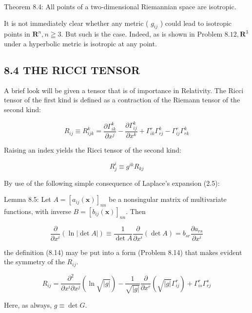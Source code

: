 \documentclass[10pt]{article}
\begin{document}
Theorem 8.4: All points of a two-dimensional Riemannian space are isotropic.

It is not immediately clear whether any metric ( $g_{i j}$ ) could lead to isotropic points in $\mathbf{R}^{n}, n \geqq 3$. But such is the case. Indeed, as is shown in Problem $8.12, \mathbf{R}^{3}$ under a hyperbolic metric is isotropic at any point.

\subsection*{8.4 THE RICCI TENSOR}
A brief look will be given a tensor that is of importance in Relativity. The Ricci tensor of the first kind is defined as a contraction of the Riemann tensor of the second kind:


\begin{equation*}
R_{i j} \equiv R_{i j k}^{k}=\frac{\partial \Gamma_{i k}^{k}}{\partial x^{j}}-\frac{\partial \Gamma_{i j}^{k}}{\partial x^{k}}+\Gamma_{i k}^{r} \Gamma_{r j}^{k}-\Gamma_{i j}^{r} \Gamma_{r k}^{k} \tag{8.14}
\end{equation*}


Raising an index yields the Ricci tensor of the second kind:


\begin{equation*}
R_{j}^{i} \equiv g^{i k} R_{k j} \tag{8.15}
\end{equation*}


By use of the following simple consequence of Laplace's expansion (2.5):

Lemma 8.5: Let $A=\left[a_{i j}(\mathbf{x})\right]_{n n}$ be a nonsingular matrix of multivariate functions, with inverse $B=\left[b_{i j}(\mathbf{x})\right]_{n n}$. Then

$$
\frac{\partial}{\partial x^{i}}(\ln |\operatorname{det} A|) \equiv \frac{1}{\operatorname{det} A} \frac{\partial}{\partial x^{i}}(\operatorname{det} A)=b_{s r} \frac{\partial a_{r s}}{\partial x^{i}}
$$

the definition (8.14) may be put into a form (Problem 8.14) that makes evident the symmetry of the $R_{i j}$.


\begin{equation*}
R_{i j}=\frac{\partial^{2}}{\partial x^{i} \partial x^{j}}(\ln \sqrt{|g|})-\frac{1}{\sqrt{|g|}} \frac{\partial}{\partial x^{r}}\left(\sqrt{|g|} \Gamma_{i j}^{r}\right)+\Gamma_{i s}^{r} \Gamma_{r j}^{s} \tag{8.16}
\end{equation*}


Here, as always, $g \equiv \operatorname{det} G$.
\end{document}
